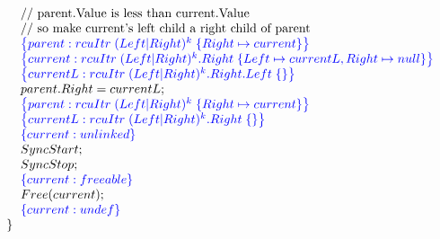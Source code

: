 \[\begin{array}{@{}l@{}}
                \;\;\;\;\;\;\text{// parent.Value is less than current.Value}\\
                \;\;\;\;\;\;\text{// so make current's left child a right child of parent}\\
                \;\;\;\;\;\;\specline{parent:rcuItr\; (Left|Right)^{k} \; \{ Right \mapsto current\} }\\
                \;\;\;\;\;\;\specline{current:rcuItr\; (Left|Right)^{k}.Right \; \{Left\mapsto currentL, Right \mapsto null\} }\\
                \;\;\;\;\;\;\specline{currentL:rcuItr\; (Left|Right)^{k}.Right.Left \; \{\} }\\
                \;\;\;\;\;\;parent.Right = currentL;\\
                \;\;\;\;\;\;\specline{parent:rcuItr\; (Left|Right)^{k} \; \{ Right \mapsto current\} }\\
                \;\;\;\;\;\;\specline{currentL:rcuItr\; (Left|Right)^{k}.Right \; \{\} }\\
                \;\;\;\;\;\;\specline{current:unlinked }\\
                \;\;\;\;\;\;SyncStart;\\
                \;\;\;\;\;\;SyncStop;\\
                \;\;\;\;\;\;\specline{current:freeable}\\
                \;\;\;\;\;\;Free(current);\\
                \;\;\;\;\;\;\specline{current:undef}\\
    \;\;\}\\
\end{array}
\]

